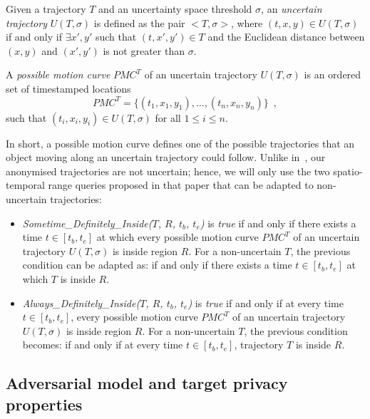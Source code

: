 \begin{definition} \label{def:motion_curve}
Given a trajectory $T$ and an uncertainty space threshold $\sigma$,
an \emph{uncertain trajectory} $U(T, \sigma)$ is defined as
the pair $<T, \sigma>$,
where $(t,x,y) \in U(T, \sigma)$ if and only if $\exists x', y'$ such that
$(t, x',y') \in T$ and the Euclidean distance between $(x,y)$ and $(x',y')$
is not greater than $\sigma$.
\end{definition}

\begin{definition}
A \emph{possible motion curve} $PMC^{T}$ of an uncertain trajectory $U(T, \sigma)$ is an ordered set of timestamped locations
\begin{equation}
PMC^{T} = \{ (t_1,x_1,y_1), \ldots, (t_n,x_n,y_n) \} \enspace,
\end{equation}
such that $(t_i,x_i,y_i) \in U(T, \sigma)$ for all $1 \leq i \leq n$.
\end{definition}

In short, a possible motion curve defines one of the possible
trajectories that an object moving along
an uncertain trajectory could follow.
Unlike in~\cite{Trajcevski:2004:MUM:1016028.1016030},
our anonymised trajectories are not uncertain;
hence, we will only
use the two
spatio-temporal range queries proposed in that paper
that can be adapted to non-uncertain trajectories:

\begin{itemize}
\item \emph{Sometime\_Definitely\_Inside($T$, $R$, $t_{b}$, $t_{e}$)}
    is \emph{true} if and only if
    there exists a time $t \in [t_b, t_e]$ at which
    every possible motion curve $PMC^T$ of an uncertain trajectory
    $U(T,\sigma)$ is inside
    region $R$. For a non-uncertain $T$, the previous condition
    can be adapted as: if and only if
    there exists a time $t \in [t_b, t_e]$ at which
      $T$ is inside $R$.
\item \emph{Always\_Definitely\_Inside($T$, $R$, $t_{b}$, $t_{e}$)}
    is \emph{true} if and only if at every time $t \in [t_b, t_e]$, every
    possible motion curve $PMC^T$ of an uncertain trajectory $U(T,\sigma)$
    is inside region $R$. For a non-uncertain $T$, the previous condition
    becomes: if and only if at every time $t \in [t_b, t_e]$, trajectory $T$ is
	    inside $R$.
\end{itemize}

\subsection{Adversarial model and target privacy properties}
\label{adversarial}

